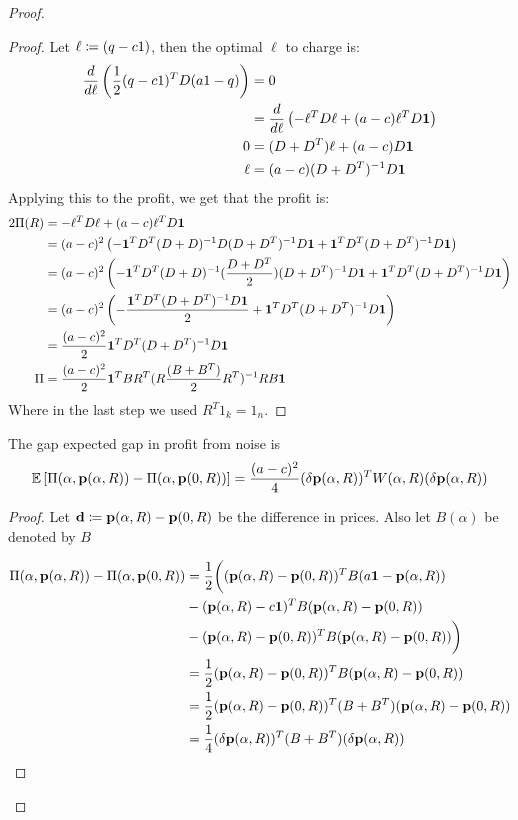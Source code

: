 \begin{proof}
\begin{proof}
            Let $\ell \coloneqq  (q-c1)$, then the optimal $\ell$ to charge is: 
            \begin{align*}
                 \frac{d}{d\ell} \left( \frac{1}{2} (q - c1)^T D (a1 - q)\right) &= 0 \\
                &=  \frac{d}{d\ell} \left( -\ell^T D \ell + (a-c) \ell^T D \mathbf{1} \right)\\
                0 &= (D+D^T) \ell + (a-c) D\mathbf{1} \\
                \ell &= (a-c) (D+D^T)^{-1} D \mathbf{1}
            \end{align*}
            Applying this to the profit, we get that the profit is:
            \begin{align*}
                2 \Pi(R) &= -\ell^T D \ell + (a-c)\ell^T D \mathbf{1}  \\ 
                &= (a-c)^2  \left( -\mathbf{1}^T D^T (D+D)^{-1} D (D+D^T)^{-1} D \mathbf{1}  + \mathbf{1}^T D^T (D+D^T)^{-1} D \mathbf{1} \right) \\ 
                &= (a-c)^2 \left( -\mathbf{1}^T D^T (D+D)^{-1} (\frac{D+D^T}{2}) (D+D^T)^{-1} D \mathbf{1}  + \mathbf{1}^T D^T (D+D^T)^{-1} D \mathbf{1} \right) \\
                &= (a-c)^2 \left( -\frac{\mathbf{1}^T D^T (D+D^T)^{-1} D \mathbf{1}}{2}  + \mathbf{1}^T D^T (D+D^T)^{-1} D \mathbf{1} \right)  \\ 
                &= \frac{(a-c)^2}{2} \mathbf{1}^T D^T (D+D^T)^{-1} D \mathbf{1}\\
                \Pi &= \frac{(a-c)^2}{2} \mathbf{1}^T B R^T (R \frac{(B+B^T)}{2} R^T)^{-1} R B \mathbf{1}
            \end{align*}
           Where in the last step we used $ R^T 1_k =  1_n$. 
    \end{proof}

    \begin{lemma}
        The gap expected gap in profit from noise is 
        $$\mathbb{E}\left[ \Pi(\alpha,\mathbf{p}(\alpha,R))  - \Pi(\alpha, \mathbf{p}(0,R)) \right] = \frac{(a-c)^2}{4} (\delta \mathbf{p}(\alpha,R))^T W(\alpha, R) (\delta \mathbf{p}(\alpha,R)) $$
    \end{lemma}

    \begin{proof}
        Let $\mathbf{d} \coloneqq \mathbf{p}(\alpha,R) -\mathbf{p}(0,R)$ be the difference in prices. Also let $B(\alpha)$ be denoted by $B$
        
        \begin{align*}
            \Pi(\alpha, \mathbf{p}(\alpha,R)) - \Pi(\alpha,  \mathbf{p}(0,R))  &= \frac{1}{2} \biggl( (\mathbf{p}(\alpha,R)-\mathbf{p}(0,R))^T B (a\mathbf{1} - \mathbf{p}(\alpha,R)) \\
            &- (\mathbf{p}(\alpha,R) - c\mathbf{1})^T B (\mathbf{p}(\alpha,R)-\mathbf{p}(0,R)) \\
            &- (\mathbf{p}(\alpha,R)-\mathbf{p}(0,R))^T B(\mathbf{p}(\alpha,R)-\mathbf{p}(0,R))\biggr) \\
            &= \frac{1}{2} (\mathbf{p}(\alpha,R)-\mathbf{p}(0,R))^T B (\mathbf{p}(\alpha,R)-\mathbf{p}(0,R)) \\
            &= \frac{1}{2} (\mathbf{p}(\alpha,R)-\mathbf{p}(0,R))^T (B+B^T) (\mathbf{p}(\alpha,R)-\mathbf{p}(0,R)) \\
            &= \frac{1}{4} (\delta \mathbf{p}(\alpha,R))^T (B+B^T) (\delta \mathbf{p}(\alpha, R))
        \end{align*}
    \end{proof}



\end{proof}
